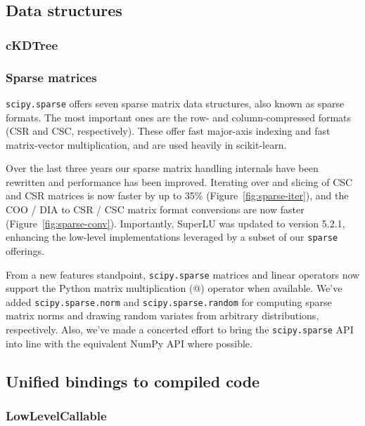 \documentclass[fleqn,10pt]{wlscirep}
\begin{document}
\subsection*{Data structures}

\subsubsection*{cKDTree}



\subsubsection*{Sparse matrices}

\texttt{scipy.sparse} offers seven sparse matrix data structures,
also known as sparse formats. The most important ones are the row- 
and column-compressed formats (CSR and CSC, respectively). 
These offer fast major-axis indexing and fast matrix-vector multiplication,
and are used heavily in scikit-learn.

Over the last three years our sparse matrix handling internals have been
rewritten and performance has been improved. Iterating over and slicing of CSC
and CSR matrices is now faster by up to 35\% (Figure~\ref{fig:sparse-iter}),
 and the COO / DIA to CSR / CSC matrix format
conversions are now faster (Figure~\ref{fig:sparse-conv}). Importantly,
SuperLU\cite{superlu_ug99} was updated to version 5.2.1, enhancing the
low-level implementations leveraged by a subset of our \texttt{sparse}
offerings.

From a new features standpoint, \texttt{scipy.sparse} matrices and linear
operators now support the Python matrix multiplication (@) operator when
available. We've added \texttt{scipy.sparse.norm} and
\texttt{scipy.sparse.random} for computing sparse matrix norms and drawing
random variates from arbitrary distributions, respectively. Also, we've made a
concerted effort to bring the \texttt{scipy.sparse} API into line with the
equivalent NumPy API where possible.

\subsection*{Unified bindings to compiled code}

\subsubsection*{LowLevelCallable}
\end{document}

